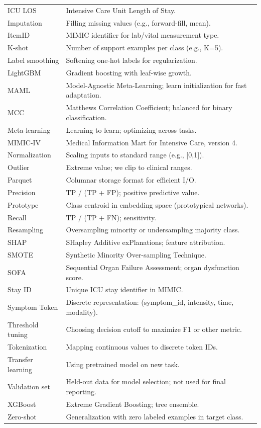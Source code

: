 \begin{longtable}{p{2.2cm}p{10cm}}
ICU LOS & Intensive Care Unit Length of Stay. \\
Imputation & Filling missing values (e.g., forward-fill, mean). \\
ItemID & MIMIC identifier for lab/vital measurement type. \\
K-shot & Number of support examples per class (e.g., K=5). \\
Label smoothing & Softening one-hot labels for regularization. \\
LightGBM & Gradient boosting with leaf-wise growth. \\
MAML & Model-Agnostic Meta-Learning; learn initialization for fast adaptation. \\
MCC & Matthews Correlation Coefficient; balanced for binary classification. \\
Meta-learning & Learning to learn; optimizing across tasks. \\
MIMIC-IV & Medical Information Mart for Intensive Care, version 4. \\
Normalization & Scaling inputs to standard range (e.g., [0,1]). \\
Outlier & Extreme value; we clip to clinical ranges. \\
Parquet & Columnar storage format for efficient I/O. \\
Precision & TP / (TP + FP); positive predictive value. \\
Prototype & Class centroid in embedding space (prototypical networks). \\
Recall & TP / (TP + FN); sensitivity. \\
Resampling & Oversampling minority or undersampling majority class. \\
SHAP & SHapley Additive exPlanations; feature attribution. \\
SMOTE & Synthetic Minority Over-sampling Technique. \\
SOFA & Sequential Organ Failure Assessment; organ dysfunction score. \\
Stay ID & Unique ICU stay identifier in MIMIC. \\
Symptom Token & Discrete representation: (symptom\_id, intensity, time, modality). \\
Threshold tuning & Choosing decision cutoff to maximize F1 or other metric. \\
Tokenization & Mapping continuous values to discrete token IDs. \\
Transfer learning & Using pretrained model on new task. \\
Validation set & Held-out data for model selection; not used for final reporting. \\
XGBoost & Extreme Gradient Boosting; tree ensemble. \\
Zero-shot & Generalization with zero labeled examples in target class. \\
\bottomrule
\end{longtable}
